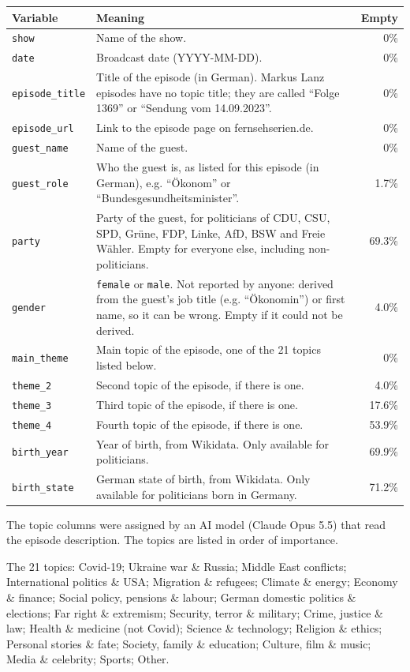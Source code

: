 \documentclass[11pt]{article}
\begin{document}
\begin{longtable}{@{}p{3.1cm}p{9cm}r@{}}
\toprule
\textbf{Variable} & \textbf{Meaning} & \textbf{Empty} \\
\midrule
\endhead
\texttt{show} & Name of the show. & 0\% \\
\texttt{date} & Broadcast date (YYYY-MM-DD). & 0\% \\
\texttt{episode\_title} & Title of the episode (in German). Markus Lanz episodes have no topic title; they are called ``Folge 1369'' or ``Sendung vom 14.09.2023''. & 0\% \\
\texttt{episode\_url} & Link to the episode page on fernsehserien.de. & 0\% \\
\texttt{guest\_name} & Name of the guest. & 0\% \\
\texttt{guest\_role} & Who the guest is, as listed for this episode (in German), e.g. ``\"Okonom'' or ``Bundesgesundheitsminister''. & 1.7\% \\
\texttt{party} & Party of the guest, for politicians of CDU, CSU, SPD, Gr\"une, FDP, Linke, AfD, BSW and Freie W\"ahler. Empty for everyone else, including non-politicians. & 69.3\% \\
\texttt{gender} & \texttt{female} or \texttt{male}. Not reported by anyone: derived from the guest's job title (e.g. ``\"Okonomin'') or first name, so it can be wrong. Empty if it could not be derived. & 4.0\% \\
\texttt{main\_theme} & Main topic of the episode, one of the 21 topics listed below. & 0\% \\
\texttt{theme\_2} & Second topic of the episode, if there is one. & 4.0\% \\
\texttt{theme\_3} & Third topic of the episode, if there is one. & 17.6\% \\
\texttt{theme\_4} & Fourth topic of the episode, if there is one. & 53.9\% \\
\texttt{birth\_year} & Year of birth, from Wikidata. Only available for politicians. & 69.9\% \\
\texttt{birth\_state} & German state of birth, from Wikidata. Only available for politicians born in Germany. & 71.2\% \\
\bottomrule
\end{longtable}

The topic columns were assigned by an AI model (Claude Opus 5.5) that read the episode
description. The topics are listed in order of importance.

The 21 topics: Covid-19; Ukraine war \& Russia; Middle East conflicts; International politics \&
USA; Migration \& refugees; Climate \& energy; Economy \& finance; Social policy, pensions \&
labour; German domestic politics \& elections; Far right \& extremism; Security, terror \&
military; Crime, justice \& law; Health \& medicine (not Covid); Science \& technology; Religion
\& ethics; Personal stories \& fate; Society, family \& education; Culture, film \& music; Media
\& celebrity; Sports; Other.
\end{document}
